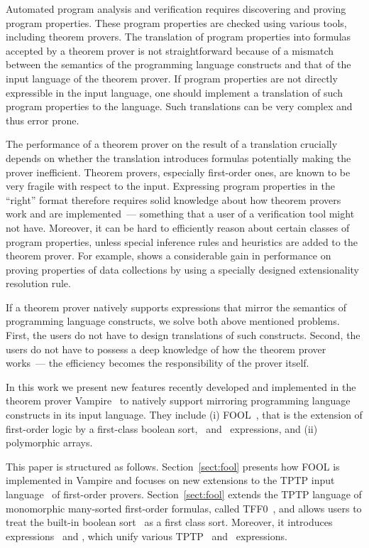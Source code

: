 Automated program analysis and verification requires discovering and proving program properties. These program properties are checked using various tools, including theorem provers. The translation of program properties into formulas accepted by a theorem prover is not straightforward because of a mismatch between the semantics of the programming language constructs and that of the input language of the theorem prover. If program properties are not directly expressible in the input language, one should implement a translation of such program properties to the language. Such translations can be very complex and thus error prone.

The performance of a theorem prover on the result of a translation crucially depends on whether the translation introduces formulas potentially making the prover inefficient. Theorem provers, especially first-order ones, are known to be very fragile with respect to the input. Expressing program properties in the ``right'' format therefore requires solid knowledge about how theorem provers work and are implemented~--- something that a user of a verification tool might not have. Moreover, it can be hard to efficiently reason about certain classes of program properties, unless special inference rules and heuristics are added to the theorem prover. For example, \cite{ATVA14} shows a considerable gain in performance on proving properties of data collections by using a specially designed extensionality resolution rule.

If a theorem prover natively supports expressions that mirror the semantics of programming language constructs, we solve both above mentioned problems. First, the users do not have to design translations of such constructs. Second, the users do not have to possess a deep knowledge of how the theorem prover works~--- the efficiency becomes the responsibility of the prover itself.

In this work we present new features recently developed and implemented in the theorem prover Vampire~\cite{Vampire13} to natively support mirroring programming language constructs in its input language. They include (i) FOOL~\cite{FOOL}, that is the extension of first-order logic by a first-class boolean sort, \ITE\ and \LETIN\ expressions, and (ii)  polymorphic arrays.

This paper is structured as follows. Section~\ref{sect:fool} presents how FOOL is implemented in Vampire and focuses on new extensions to the TPTP input language~\cite{TPTP} of first-order provers. Section~\ref{sect:fool}  extends the TPTP language of monomorphic many-sorted first-order formulas, called TFF0~\cite{tff0}, and allows users to treat the built-in boolean sort \tptpo\ as a first class sort. Moreover, it introduces expressions \dite\ and \dlet, which unify various TPTP \ITE\ and \LETIN\ expressions.


